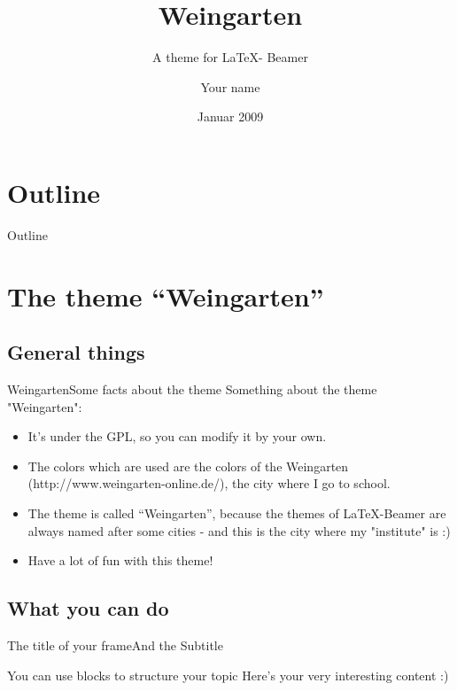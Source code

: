 \documentclass{beamer}
\title{Weingarten}
\subtitle{A theme for \LaTeX - Beamer}
\author{Your name}
\institute{Your institute}
\date{Januar 2009}
\begin{document}
%
%

\begin{frame}
	\titlepage
\end{frame}

% 
%
\section*{Outline}
\begin{frame}{Outline}
	\tableofcontents
\end{frame}

\section{The theme "`Weingarten"'}

\subsection{General things}
\begin{frame}{Weingarten}{Some facts about the theme}
Something about the theme "Weingarten":
\begin{itemize}
	\item It's under the GPL, so you can modify it by your own.
	\item The colors which are used are the colors of the Weingarten (http://www.weingarten-online.de/), the city where I go to school.
	\item The theme is called "`Weingarten"', because the themes of \LaTeX-Beamer are always named after some cities - and this is the city where my "institute" is :)
	\item Have a lot of fun with this theme!
\end{itemize}
\end{frame}

\subsection{What you can do}
\begin{frame}{The title of your frame}{And the Subtitle}
	\begin{block}{You can use blocks to structure your topic}
	Here's your very interesting content :)
	\end{block}

\end{frame}
\end{document}
